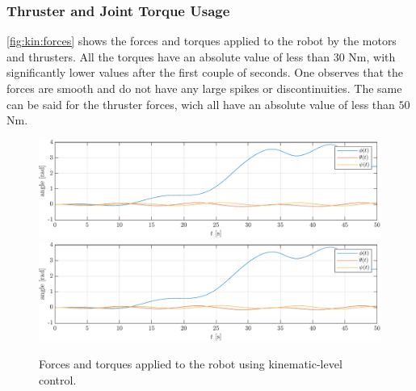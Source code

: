 \subsubsection{Thruster and Joint Torque Usage}
\autoref{fig:kin:forces} shows the forces and torques applied to the robot by the
motors and thrusters. All the torques have an absolute value of less than $30$ Nm,
with significantly lower values after the first couple of seconds. One observes
that the forces are smooth and do not have any large spikes or discontinuities.
The same can be said for the thruster forces, wich all have an absolute value of less
than $50$ Nm.
\begin{figure}[h!]
    \centering
    \includegraphics[page=7,width=\linewidth]{assets/results/kinematic/plot.pdf}
    \includegraphics[page=8,width=\linewidth]{assets/results/kinematic/plot.pdf}
    \caption{Forces and torques applied to the robot using kinematic-level control.}
    \label{fig:kin:forces}
\end{figure}


